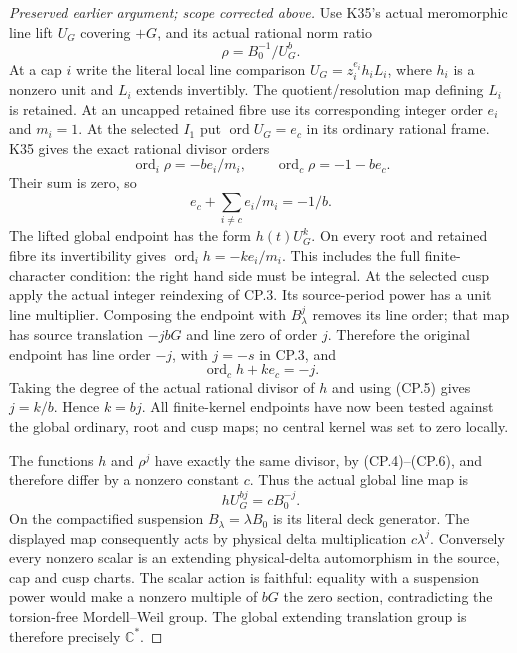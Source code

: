 \begin{proof}[Preserved earlier argument; scope corrected above]
Use K35's actual meromorphic line lift \(U_G\) covering \(+G\),
and its actual rational norm ratio
\[
                   \rho=B_0^{-1}/U_G^b.                   \tag{CP.4}
\]
At a cap \(i\) write the literal local line comparison
\(U_G=z_i^{e_i}h_iL_i\), where \(h_i\) is a nonzero unit and
\(L_i\) extends invertibly. The quotient/resolution map defining
\(L_i\) is retained. At an uncapped retained fibre use its
corresponding integer order \(e_i\) and \(m_i=1\). At the
selected \(I_1\) put \(\operatorname{ord}U_G=e_c\) in its
ordinary rational frame. K35 gives the exact rational divisor orders
\[
 \operatorname{ord}_i\rho=-be_i/m_i,
 \qquad\operatorname{ord}_c\rho=-1-be_c.
\]
Their sum is zero, so
\[
                   e_c+\sum_{i\ne c}e_i/m_i=-1/b.          \tag{CP.5}
\]
The lifted global endpoint has the form \(h(t)U_G^k\). On every
root and retained fibre its invertibility gives
\(\operatorname{ord}_i h=-ke_i/m_i\). This includes the full
finite-character condition: the right hand side must be integral.
At the selected cusp apply the actual integer reindexing of CP.3.
Its source-period power has a unit line multiplier. Composing the
endpoint with \(B_\lambda^j\) removes its line order; that map
has source translation \(-jbG\) and line zero of order \(j\).
Therefore the original endpoint has line order \(-j\), with
\(j=-s\) in CP.3, and
\[
                      \operatorname{ord}_c h+ke_c=-j.
                                                               \tag{CP.6}
\]
Taking the degree of the actual rational divisor of \(h\) and
using (CP.5) gives \(j=k/b\). Hence \(k=bj\). All finite-kernel
endpoints have now been tested against the global ordinary, root
and cusp maps; no central kernel was set to zero locally.

The functions \(h\) and \(\rho^j\) have exactly the same divisor,
by (CP.4)--(CP.6), and therefore differ by a nonzero constant \(c\).
Thus the actual global line map is
\[
                hU_G^{bj}=cB_0^{-j}.
\]
On the compactified suspension \(B_\lambda=\lambda B_0\) is its
literal deck generator. The displayed map consequently acts by
physical delta multiplication \(c\lambda^j\). Conversely every
nonzero scalar is an extending physical-delta automorphism in the
source, cap and cusp charts. The scalar action is faithful: equality
with a suspension power would make a nonzero multiple of \(bG\)
the zero section, contradicting the torsion-free Mordell--Weil group.
The global extending translation group is therefore precisely
\(\mathbb C^*\).

\par


\end{proof}
